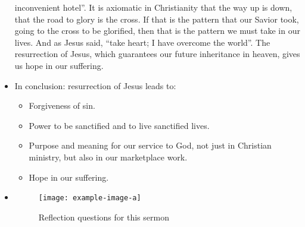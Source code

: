 \begin{itemize}
{  inconvenient hotel''. It is axiomatic in Christianity that the way up is down, that the road to glory is the cross. If that is the pattern that our Savior took, going to the cross to be glorified, then that is the pattern we must take in our lives. And as Jesus said, ``take heart; I have overcome the world''. The resurrection of Jesus, which guarantees our future inheritance in heaven, gives us hope in our suffering. }
  \item{In conclusion: resurrection of Jesus leads to:
  \begin{itemize}
    \item{Forgiveness of sin.}
    \item{Power to be sanctified and to live sanctified lives.}
    \item{Purpose and meaning for our service to God, not just in Christian ministry, but also in our marketplace work.}
    \item{Hope in our suffering.}
  \end{itemize}
  }
  \item{\begin{figure}[H]
    \centering
    \texttt{[image: example-image-a]}
    \caption[]{Reflection questions for this sermon}
    \label{}
  \end{figure}}
\end{itemize}